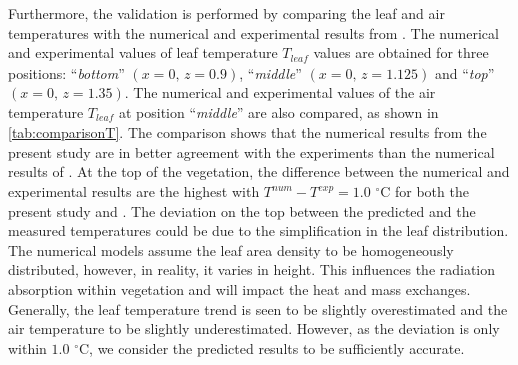 Furthermore, the validation is performed by comparing the leaf and air temperatures with the numerical and experimental results from \cite{Kichah2012}. The numerical and experimental values of leaf temperature $T_{\mathit{leaf}}$ values are obtained for three positions: ``\textit{bottom}'' $(x=0,\,z=0.9)$, ``\textit{middle}'' $(x=0,\,z=1.125)$ and ``\textit{top}'' $(x=0,\,z=1.35)$. The numerical and experimental values of the air temperature $T_{\mathit{leaf}}$ at position ``\textit{middle}'' are also compared, as shown in \cref{tab:comparisonT}. The comparison shows that the numerical results from the present study are in better agreement with the experiments than the numerical results of \cite{Kichah2012}. At the top of the vegetation, the difference between the numerical and experimental results are the highest with $T^{\mathit{num}}-T^{\mathit{exp}}=1.0$ $^{\circ}$C for both the present study and  \cite{Kichah2012}. The deviation on the top between the predicted and the measured temperatures could be due to the simplification in the leaf distribution. The numerical models assume the leaf area density to be homogeneously distributed, however, in reality, it varies in height. This influences the radiation absorption within vegetation and will impact the heat and mass exchanges. Generally, the leaf temperature trend is seen to be slightly overestimated and the air temperature to be slightly underestimated. However, as the deviation is only within $1.0$ $^{\circ}$C, we consider the predicted results to be sufficiently accurate.  

